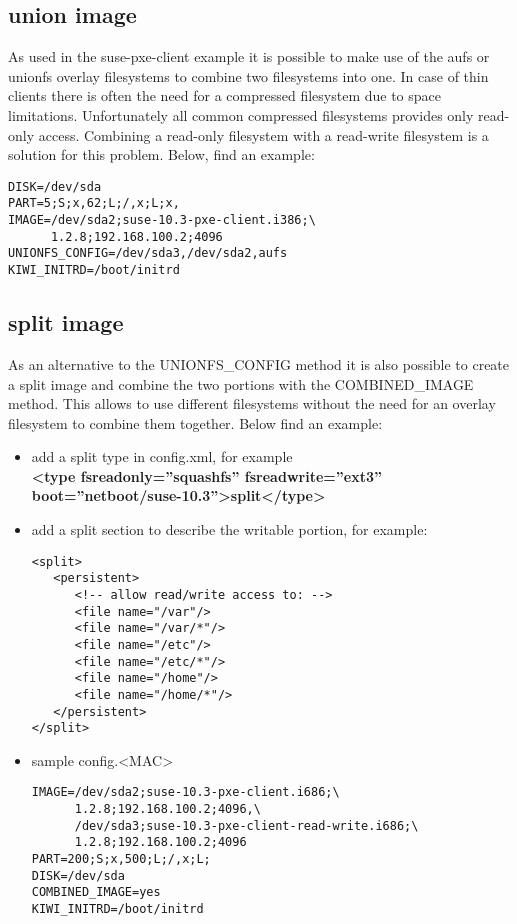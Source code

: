\subsection{union image}

As used in the suse-pxe-client example it is possible to make use of the
aufs or unionfs overlay filesystems to combine two filesystems
into one. In case of thin clients there is often the need for
a compressed filesystem due to space limitations. Unfortunately
all common compressed filesystems provides only read-only access.
Combining a read-only filesystem with a read-write filesystem
is a solution for this problem. Below, find an example:

\begin{Command}{12cm}
\begin{verbatim}
DISK=/dev/sda
PART=5;S;x,62;L;/,x;L;x,
IMAGE=/dev/sda2;suse-10.3-pxe-client.i386;\
      1.2.8;192.168.100.2;4096
UNIONFS_CONFIG=/dev/sda3,/dev/sda2,aufs
KIWI_INITRD=/boot/initrd
\end{verbatim}
\end{Command}

\subsection{split image}

As an alternative to the UNIONFS\_CONFIG method it is also
possible to create a split image and combine the two portions
with the COMBINED\_IMAGE method. This allows to use different
filesystems without the need for an overlay filesystem to combine
them together. Below find an example:

\begin{itemize}
\item add a split type in config.xml, for example\\
      \textbf{<type fsreadonly=''squashfs'' fsreadwrite=''ext3''
      boot=''netboot/suse-10.3''>split</type>}
\item add a split section to describe the writable portion,
      for example:
\begin{verbatim}
<split>
   <persistent>
      <!-- allow read/write access to: -->
      <file name="/var"/>
      <file name="/var/*"/>
      <file name="/etc"/>
      <file name="/etc/*"/>
      <file name="/home"/>
      <file name="/home/*"/>
   </persistent>
</split>
\end{verbatim}
\item sample config.<MAC>
     
\begin{Command}{14cm}
\begin{verbatim}
IMAGE=/dev/sda2;suse-10.3-pxe-client.i686;\
      1.2.8;192.168.100.2;4096,\
      /dev/sda3;suse-10.3-pxe-client-read-write.i686;\
      1.2.8;192.168.100.2;4096
PART=200;S;x,500;L;/,x;L;
DISK=/dev/sda
COMBINED_IMAGE=yes
KIWI_INITRD=/boot/initrd
\end{verbatim}
\end{Command}
\end{itemize}

